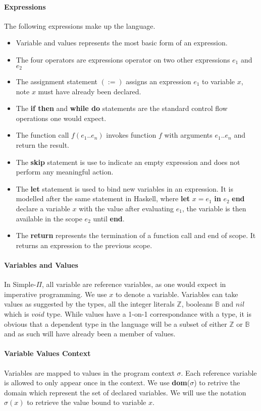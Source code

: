 \documentclass[a4paper,12pt]{report}
\begin{document}
\paragraph{Expressions} The following expressions make up the language.
\begin{itemize}
  \item Variable and values represents the most basic form of an expression.
  \item The four operators are expressions operator on two other expressions $e_1$ 
  and $e_2$
  \item The assignment statement $(:=)$ assigns an expression $e_1$ to variable 
  $x$, note $x$ must have already been declared. 
  \item The \textbf{if then} and \textbf{while do} statements are the standard 
  control flow operations one would expect.
  \item The function call $f(e_1..e_n)$ invokes function $f$ with arguments 
  $e_1..e_n$ and return the result.
  \item The \textbf{skip} statement is use to indicate an empty expression and 
  does not perform any meaningful action. 
  \item The \textbf{let} statement is used to bind new variables in an 
  expression. It is modelled after the same statement in Haskell, where \textbf{let} 
  $x = e_1$ \textbf{in} $e_2$ \textbf{end} declare a variable $x$ with the value after 
  evaluating $e_1$, the variable is then available in the scope $e_2$ until 
  \textbf{end}.
  \item The \textbf{return} represents the termination of a function call and 
  end of scope. It returns an expression to the previous scope. 
\end{itemize}

\paragraph{Variables and Values} In Simple-$\Pi$, all variable are reference 
variables, as one would expect in imperative programming. We use $x$ to denote a 
variable. Variables can take values as suggested by the types, all the integer 
literals $\mathbb{Z}$, booleans $\mathbb{B}$ and $nil$ which is $void$ type. 
While values have a 1-on-1 correspondance with a type, it is obvious that a 
dependent type in the language will be a subset of either 
$\mathbb{Z}$ or $\mathbb{B}$ and as such will have already been a member of 
values.

\paragraph{Variable Values Context} Variables are mapped to values in the program 
context $\sigma$. Each reference variable is allowed to only appear once in 
the context. We use \textbf{dom}($\sigma$) to retrive the domain which represent 
the set of declared variables. We will use the notation $\sigma(x)$ 
to retrieve the value bound to variable $x$.
\end{document}
